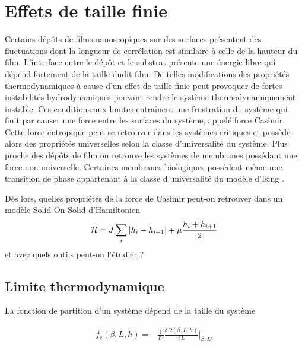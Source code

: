 \chapter{Effets de taille finie}
    \label{chap-sos}

Certains dépôts de films nanoscopiques sur des surfaces présentent des fluctuations dont la longueur de corrélation est similaire à celle de la hauteur du film. L'interface entre le dépôt et le substrat présente une énergie libre qui dépend fortement de la taille dudit film\cite{ouyang_size-dependent_2006,jiang_size_2008}. De telles modifications des propriétés thermodynamiques à cause d'un effet de taille finie peut provoquer de fortes instabilités hydrodynamiques pouvant rendre le système thermodynamiquement instable\cite{ding_theoretical_2001}. Ces conditions aux limites entraînent une frustration du système qui finit par causer une force entre les surfaces du système, appelé force Casimir. Cette force entropique peut se retrouver dans les systèmes critiques\cite{} et possède alors des propriétés universelles selon la classe d'universalité du système. Plus proche des dépôts de film on retrouve les systèmes de membranes\cite{nelson_statistical_2004} possédant une force non-universelle\cite{hasnaoui_casimir_2010}. Certaines membranes biologiques possèdent même une transition de phase appartenant à la classe d'universalité du modèle d'Ising \cite{machta_critical_2012}.

Dès lors, quelles propriétés de la force de Casimir peut-on retrouver dans un modèle Solid-On-Solid d'Hamiltonien
\begin{align}
    \mathcal{H} = J \sum_i |h_i-h_{i+1}| + \mu \frac{h_i+h_{i+1}}{2}
\end{align}
et avec quels outils peut-on l'étudier ?

\section{Limite thermodynamique}





La fonction de partition d'un système dépend de la taille du système 
	
\begin{align}
    f_c(\beta,L,h) = - \frac{1}{L'} \frac{\delta \Omega(\beta,L,h)}{\delta L} \bigg|_{\beta,L'}
    \label{casimir-interface}
\end{align}	

